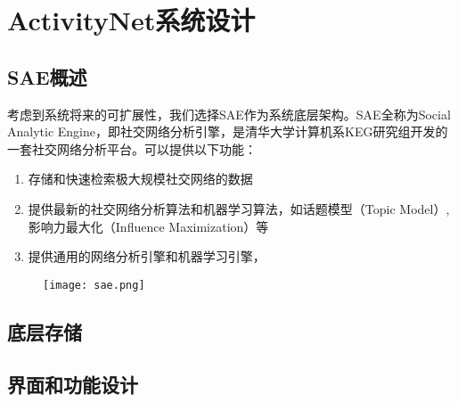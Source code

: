 \chapter{ActivityNet系统设计}

\section{SAE概述}
考虑到系统将来的可扩展性，我们选择SAE作为系统底层架构。SAE全称为Social Analytic Engine，即社交网络分析引擎，是清华大学计算机系KEG研究组开发的一套社交网络分析平台。可以提供以下功能：
\begin{enumerate}
\item 存储和快速检索极大规模社交网络的数据
\item 提供最新的社交网络分析算法和机器学习算法，如话题模型（Topic Model）, 影响力最大化（Influence Maximization）等
\item 提供通用的网络分析引擎和机器学习引擎，
\end{enumerate}

\begin{figure}[!h]
\centering
\texttt{[image: sae.png]}
\end{figure}

\section{底层存储}
\section{界面和功能设计}
